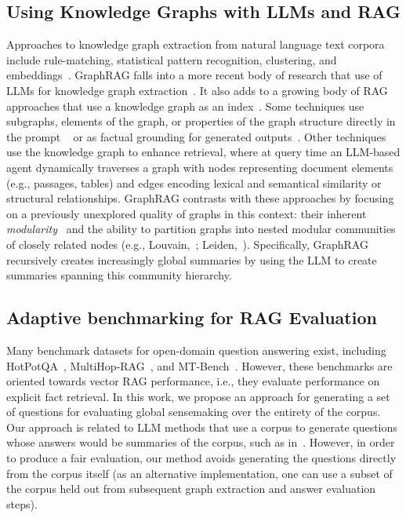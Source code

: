\documentclass{article}
\begin{document}
\subsection{Using Knowledge Graphs with LLMs and RAG}
\label{sec:graphlit}

Approaches to knowledge graph extraction from natural language text corpora include rule-matching, statistical pattern recognition, clustering, and embeddings~\citep{yates-etal-2007-textrunner, mooney, kimprob, knowitall}.
GraphRAG falls into a more recent body of research that use of LLMs for knowledge graph extraction~\citep{melnyk2022knowledge, representationlearning, openai2023chatgpt, ban2023query, zhang2024causal, Trajanoska2023EnhancingKG, yao2023exploring, yates-etal-2007-textrunner}.
It also adds to a growing body of RAG approaches that use a knowledge graph as an index~\citep{gao2023retrieval}.
Some techniques use subgraphs, elements of the graph, or properties of the graph structure directly in the prompt ~\citep{baek2023knowledge, he2024g, zhang2023graph} or as factual grounding for generated outputs~\citep{kang2023knowledge, ranade2023fabula}.
Other techniques~\citep{wang2023knowledge} use the knowledge graph to enhance retrieval, where at query time an LLM-based agent dynamically traverses a graph with nodes representing document elements (e.g., passages, tables) and edges encoding lexical and semantical similarity or structural relationships.
GraphRAG contrasts with these approaches by focusing on a previously unexplored quality of graphs in this context: their inherent \emph{modularity}~\citep{newman2006modularity} and the ability to partition graphs into nested modular communities of closely related nodes (e.g., Louvain,~\citealt{blondel2008fast}; Leiden,~\citealt{Traag2019Leiden}).
Specifically, GraphRAG recursively creates increasingly global summaries by using the LLM to create summaries spanning this community hierarchy.

\subsection{Adaptive benchmarking for RAG Evaluation}
Many benchmark datasets for open-domain question answering exist, including HotPotQA~\citep{yang2018hotpotqa}, MultiHop-RAG~\citep{tang2024multihop}, and MT-Bench~\citep{zheng2024judging}.
However, these benchmarks are oriented towards vector RAG performance, i.e., they evaluate performance on explicit fact retrieval. 
In this work, we propose an approach for generating a set of questions for evaluating global sensemaking over the entirety of the corpus.
Our approach is related to LLM methods that use a corpus to generate questions whose answers would be summaries of the corpus, such as in~\cite{xu2021text}.
However, in order to produce a fair evaluation, our method avoids generating the questions directly from the corpus itself (as an alternative implementation, one can use a subset of the corpus held out from subsequent graph extraction and answer evaluation steps).
\end{document}
